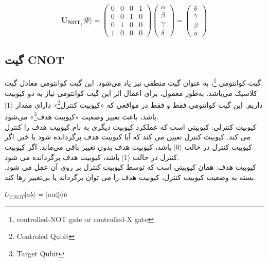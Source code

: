 \documentclass{book}
\begin{document}
\begin{center}
	$$\boldsymbol{U}_{\boldsymbol{N} \boldsymbol{O} \boldsymbol{T}_2}|\Psi\rangle=\left(\begin{array}{llll}
		0 & 0 & 0 & 1 \\
		0 & 0 & 1 & 0 \\
		0 & 1 & 0 & 0 \\
		1 & 0 & 0 & 0
	\end{array}\right)\left(\begin{array}{l}
		\alpha \\
		\beta \\
		\gamma \\
		\delta
	\end{array}\right)=\left(\begin{array}{l}
		\delta \\
		\gamma \\
		\beta \\
		\alpha
	\end{array}\right)$$
\end{center}


\subsection*{گیت CNOT}

گیت کوانتومی \footnote{ controlled-NOT gate or controlled-X gate}، به عنوان گیت منطقی نیز یاد می‌شود. این گیت کوانتومی معادل گیت  کلاسیک می‌باشد.
به‌طور معمول، برای اعمال اثر این گیت کوانتومی نیاز به دو کیوبیت داریم. این گیت کوانتومی فقط و فقط در مواقعی که «کیوبیت کنترل\footnote{Controled Qubit}» دارای مقدار $\vert 1 \rangle$ باشد، باعث تغییر وضعیت «کیوبیت هدف\footnote{Target Qubit}» می‌شود.\\

کیوبیت کنترلی: کیوبیتی است که عملکرد کیوبیت دیگری به نام کیوبیت هدف را کنترل می کند. کیوبیت کنترل تعیین می کند که آیا کیوبیت هدف برگردانده شود یا خیر. اگر کیوبیت کنترل در حالت $\vert 0 \rangle$ باشد، کیوبیت هدف بدون تغییر باقی می‌ماند. اگر کیوبیت کنترل در حالت $\vert 1 \rangle$ باشد، کیوبیت هدف برگردانده می شود.\\

کیوبیت هدف: همان کیوبیتی است که توسط کیوبیت کنترل بر روی آن عمل می شود. بسته به وضعیت کیوبیت کنترل، کیوبیت هدف را می توان برگرداند یا بی‌تغییر رها کند.\\


\begin{center}
	$U_{CNOT}\vert ab\rangle = \vert a a\oplus \rangle b$
\end{center}
\end{document}
